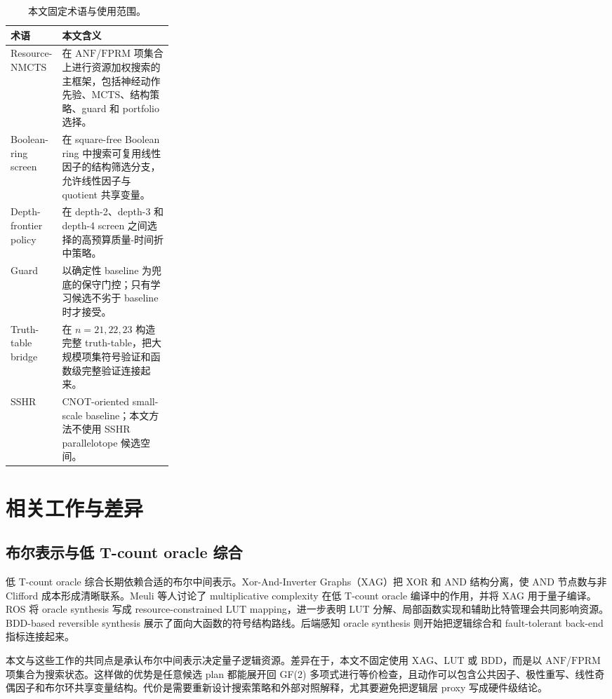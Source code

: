 \documentclass[UTF8,fontset=macnew,11pt]{ctexart}
\newcommand{\method}{Resource-NMCTS}
\newcommand{\anf}{\ensuremath{\mathrm{ANF}}}
\newcommand{\fprm}{\ensuremath{\mathrm{FPRM}}}
\newcommand{\mcts}{\ensuremath{\mathrm{MCTS}}}
\newcommand{\ttable}{truth-table}
\begin{document}
\begin{table}[H]
\centering
\small
\caption{本文固定术语与使用范围。}
\label{tab:terms}
\begin{tabularx}{\linewidth}{>{\raggedright\arraybackslash}p{0.27\linewidth}>{\raggedright\arraybackslash}X}
\toprule
术语 & 本文含义 \\
\midrule
\method{} & 在 \anf{}/\fprm{} 项集合上进行资源加权搜索的主框架，包括神经动作先验、\mcts{}、结构策略、guard 和 portfolio 选择。 \\
Boolean-ring screen & 在 square-free Boolean ring 中搜索可复用线性因子的结构筛选分支，允许线性因子与 quotient 共享变量。 \\
Depth-frontier policy & 在 depth-2、depth-3 和 depth-4 screen 之间选择的高预算质量-时间折中策略。 \\
Guard & 以确定性 baseline 为兜底的保守门控；只有学习候选不劣于 baseline 时才接受。 \\
Truth-table bridge & 在 $n=21,22,23$ 构造完整 \ttable{}，把大规模项集符号验证和函数级完整验证连接起来。 \\
SSHR & CNOT-oriented small-scale baseline；本文方法不使用 SSHR parallelotope 候选空间。 \\
\bottomrule
\end{tabularx}
\end{table}

\section{相关工作与差异}

\subsection{布尔表示与低 T-count oracle 综合}

低 T-count oracle 综合长期依赖合适的布尔中间表示。Xor-And-Inverter Graphs（XAG）把 XOR 和 AND 结构分离，使 AND 节点数与非 Clifford 成本形成清晰联系。Meuli 等人讨论了 multiplicative complexity 在低 T-count oracle 编译中的作用\cite{meuli2019multiplicative}，并将 XAG 用于量子编译\cite{meuli2022xag}。ROS 将 oracle synthesis 写成 resource-constrained LUT mapping\cite{meuli2020ros}，进一步表明 LUT 分解、局部函数实现和辅助比特管理会共同影响资源。BDD-based reversible synthesis 展示了面向大函数的符号结构路线\cite{wille2009bdd}。后端感知 oracle synthesis 则开始把逻辑综合和 fault-tolerant back-end 指标连接起来\cite{yu2025backend}。

本文与这些工作的共同点是承认布尔中间表示决定量子逻辑资源。差异在于，本文不固定使用 XAG、LUT 或 BDD，而是以 \anf{}/\fprm{} 项集合为搜索状态。这样做的优势是任意候选 plan 都能展开回 GF(2) 多项式进行等价检查，且动作可以包含公共因子、极性重写、线性奇偶因子和布尔环共享变量结构。代价是需要重新设计搜索策略和外部对照解释，尤其要避免把逻辑层 proxy 写成硬件级结论。
\end{document}
